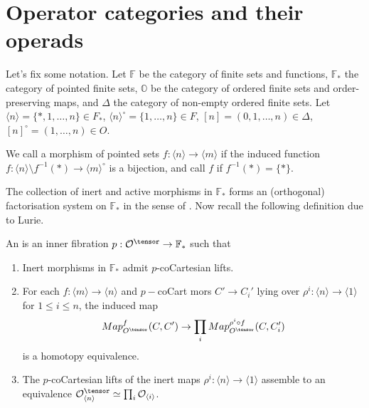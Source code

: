 \section{Operator categories and their operads}\label{sec:operator-category}
Let's fix some notation. Let $\mathbb{F}$ be the category of finite sets and functions, $\mathbb{F}_*$ the category of pointed finite sets, $\mathbb{O}$ be the category of ordered finite sets and order-preserving maps, and $\Delta$ the category of non-empty ordered finite sets. Let $\langle n \rangle=\{*,1,\dots,n\} \in F_*$, $\langle n \rangle^\circ=\{1,\dots,n\}\in F$, $[n]=(0,1,\dots,n) \in \Delta$, $[n]^\circ=(1,\dots,n) \in O$.
\begin{definition}\label{def:inert-active}
We call a morphism of pointed sets $f:\langle n\rangle\rightarrow \langle m \rangle$  if the induced function $f:\langle n \rangle\setminus f^{-1}(*)\rightarrow \langle m \rangle ^\circ$ is a bijection, and call $f$  if $f^{-1}(*)=\{*\}$.
\end{definition}
The collection of inert and active morphisms in $\mathbb{F}_*$ forms an (orthogonal) factorisation system on $\mathbb{F}_*$ in the sense of \cite{Freyd-Kelly}. Now recall the following definition due to Lurie.

\begin{definition}\label{def:operad}
    An  is an inner fibration $p:\mathcal{O}^\tensor \rightarrow \mathbb{F}_*$ such that
    \begin{enumerate}
        \item Inert morphisms in $\mathbb{F}_*$ admit $p$-coCartesian lifts.
        \item For each $f:\langle m \rangle \rightarrow \langle n \rangle$ and $p-$coCart mors $C'\rightarrow C_i'$ lying over $\rho^i:\langle n \rangle \rightarrow\langle 1 \rangle$ for $1\leq i \leq n$, the induced map 
        $$Map_{O^\tensor}^f(C,C')\rightarrow\prod_i Map_{O^\tensor}^{\rho^i \circ f}(C,C_i')$$
        is a homotopy equivalence.
        \item The $p$-coCartesian lifts of the inert maps $\rho^i:\langle n \rangle \rightarrow \langle 1 \rangle$ assemble to an equivalence $\mathcal{O}^\tensor_{\langle n \rangle}\simeq \prod_{i}\mathcal{O}_{\langle i \rangle }$.
    \end{enumerate}
\end{definition}

